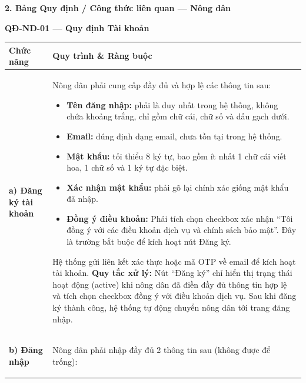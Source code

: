 \documentclass[12pt,a4paper]{article}
\begin{document}
\vspace{0.3cm}
\textbf{2. Bảng Quy định / Công thức liên quan --- Nông dân}

\vspace{0.3cm}
\noindent\textbf{QĐ-ND-01 --- Quy định Tài khoản}

\begin{longtable}{|
        >{\raggedright\arraybackslash}p{2.8cm}|
        >{\raggedright\arraybackslash}p{12cm}|}
    \hline
    \rowcolor{headerblue}
    \textbf{Chức năng}             & \textbf{Quy trình \& Ràng buộc}                                                                                                                                                                                                       \\
    \hline
    \endhead
    \textbf{a) Đăng ký tài khoản}  &
    Nông dân phải cung cấp đầy đủ và hợp lệ các thông tin sau:
    \begin{itemize}[leftmargin=*,topsep=2pt,itemsep=1pt]
        \item \textbf{Tên đăng nhập:} phải là duy nhất trong hệ thống, không chứa khoảng trắng, chỉ gồm chữ cái, chữ số và dấu gạch dưới.
        \item \textbf{Email:} đúng định dạng email, chưa tồn tại trong hệ thống.
        \item \textbf{Mật khẩu:} tối thiểu 8 ký tự, bao gồm ít nhất 1 chữ cái viết hoa, 1 chữ số và 1 ký tự đặc biệt.
        \item \textbf{Xác nhận mật khẩu:} phải gõ lại chính xác giống mật khẩu đã nhập.
        \item \textbf{Đồng ý điều khoản:} Phải tích chọn checkbox xác nhận ``Tôi đồng ý với các điều khoản dịch vụ và chính sách bảo mật''. Đây là trường bắt buộc để kích hoạt nút Đăng ký.
    \end{itemize}
    Hệ thống gửi liên kết xác thực hoặc mã OTP về email để kích hoạt tài khoản. \newline
    \textbf{Quy tắc xử lý:} Nút ``Đăng ký'' chỉ hiển thị trạng thái hoạt động (active) khi nông dân đã điền đầy đủ thông tin hợp lệ và tích chọn checkbox đồng ý với điều khoản dịch vụ. Sau khi đăng ký thành công, hệ thống tự động chuyển nông dân tới trang đăng nhập. \\
    \hline
    \textbf{b) Đăng nhập}          &
    Nông dân phải nhập đầy đủ 2 thông tin sau (không được để trống):
    \begin{itemize}[leftmargin=*,topsep=2pt,itemsep=1pt]

\end{itemize}
\end{longtable}
\end{document}

